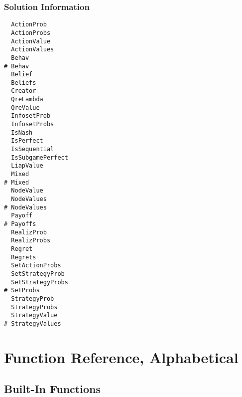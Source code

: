 \subsection{Solution Information}

\begin{multicols}{3}
\begin{verbatim}
  ActionProb 
  ActionProbs 
  ActionValue 
  ActionValues 
  Behav 
# Behav 
  Belief 
  Beliefs 
  Creator
  QreLambda 
  QreValue 
  InfosetProb 
  InfosetProbs 
  IsNash 
  IsPerfect 
  IsSequential 
  IsSubgamePerfect 
  LiapValue 
  Mixed
# Mixed
  NodeValue 
  NodeValues 
# NodeValues 
  Payoff 
# Payoffs 
  RealizProb 
  RealizProbs 
  Regret
  Regrets
  SetActionProbs 
  SetStrategyProb 
  SetStrategyProbs 
# SetProbs
  StrategyProb 
  StrategyProbs
  StrategyValue 
# StrategyValues 
\end{verbatim}
\end{multicols}

\chapter{Function Reference, Alphabetical}
\pagestyle{lexicon}

\section{Built-In Functions}


